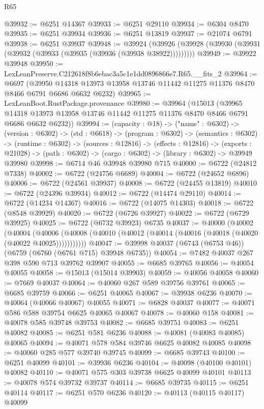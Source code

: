 \begin{lexlean}{R65}
\begin{coremodule}
{@39932 := @6251 @14367
@39933 := @6251 @29110
@39934 := @6304 @8470
@39935 := @6251 @39934
@39936 := @6251 @13819
@39937 := @21074 @6791
@39938 := @6251 @39937
@39948 := @39924
    (@39926 (@39928 (@39930 (@39931 (@39932 (@39933 (@39935 (@39936 (@39938 @38922)))))))))
@39949 := @39922 @39948
@39950 := LexLeanPreserve.C212618f8b6ebac3a5c1e1dd0896866e7.R65.__fits_2
@39964 := @6697
    (@39950 @14318 @13973 @13958 @13746 @11442 @11275 @11376 @8470 @8466 @6791 @6686 @6632 @6232)
@39965 := LexLeanBoot.RustPackage.provenance
@39980 := @39964
    (@15013
      (@39965 @14318 @13973 @13958 @13746 @11442 @11275 @11376 @8470 @8466 @6791 @6686 @6632 @6232))
@39994 := (capacity : @18) ->
  ("name" : @6302) ->
  (version : @6302) ->
  (std : @6618) ->
  (program : @6302) ->
  (semantics : @6302) ->
  (runtime : @6302) ->
  (sources : @12816) ->
  (effects : @12816) ->
  (exports : @21028) -> (path : @6302) -> (cargo : @6302) -> (library : @6302) -> @39949 @39980
@39998 := @6714 @46 @39948 @39980 @715
@40000 := @6722 (@24812 @7338)
@40002 := @6722 (@24756 @6689)
@40004 := @6722 (@24652 @6896)
@40006 := @6722 (@24561 @39937)
@40008 := @6722 (@24455 @13819)
@40010 := @6722 (@24396 @39934)
@40012 := @6722 (@14474 @29110)
@40014 := @6722 (@14234 @14367)
@40016 := @6722 (@14075 @14303)
@40018 := @6722 (@8548 @39929)
@40020 := @6722 (@6726 @39927)
@40022 := @6722 (@6729 @39925)
@40025 := @6722 (@6732 @39923) @6735
@40037 := @40000
    (@40002
      (@40004
        (@40006 (@40008 (@40010 (@40012 (@40014 (@40016 (@40018 (@40020 (@40022 @40025)))))))))))
@40047 := @39998 @40037 (@6743 (@6753 @46)) (@6759 (@6760 (@6761 @715) @39948 @6735))
@40054 := @7482 @40037 @267 @398 @590 @713 @39762 @39907
@40055 := @6685 @39765
@40056 := @40054 @40055
@40058 := @15013 (@15014 @39903)
@40059 := @40056 @40058
@40060 := @7669 @40037
@40064 := @40060 @267 @589 @39756 @39761
@40065 := @6685 @39759
@40066 := @6251 @40065
@40067 := @39938 @6236
@40070 := @40064 (@40066 @40067) @40055
@40071 := @6828 @40037
@40077 := @40071 @586 @588 @39754 @6625 @40065 @40067
@40078 := @40060 @158
@40081 := @40078 @585 @39748 @39753
@40082 := @6685 @39751
@40083 := @6251 @40082
@40085 := @6251 @581 @6236
@40088 := @40081 (@40083 @40085) @40065
@40094 := @40071 @578 @584 @39746 @6625 @40082 @40085
@40098 := @40060 @285 @577 @39740 @39745
@40099 := @6685 @39743
@40100 := @6251 @40099
@40101 := @39936 @6236
@40104 := @40098 (@40100 @40101) @40082
@40110 := @40071 @575 @303 @39738 @6625 @40099 @40101
@40113 := @40078 @574 @39732 @39737
@40114 := @6685 @39735
@40115 := @6251 @40114
@40117 := @6251 @570 @6236
@40120 := @40113 (@40115 @40117) @40099
}
\end{coremodule}
\end{lexlean}
